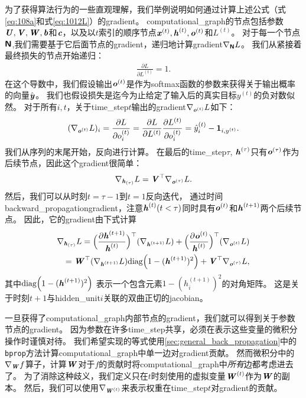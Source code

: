 为了获得算法行为的一些直观理解，我们举例说明如何通过计算上述公式（式\eqref{eq:108a}和式\eqref{eq:1012L}）的\gls{gradient}。
\gls{computational_graph}的节点包括参数$\boldsymbol{\mathit{U}},\boldsymbol{\mathit{V}},\boldsymbol{\mathit{W}}, \boldsymbol{\mathit{b}}$和$\boldsymbol{\mathit{c}}$，以及以$t$索引的顺序节点$\boldsymbol{\mathit{x}}^{(t)}, \boldsymbol{\mathit{h}}^{(t)},\boldsymbol{\mathit{o}}^{(t)}$和$L^{(t)}$。
对于每一个节点$\textsf{\textbf{N}}$,我们需要基于它后面节点的\gls{gradient}，递归地计算\gls{gradient}$\nabla_{\textsf{\textbf{N}}} L$。
我们从紧接着最终损失的节点开始递归：
\begin{align}
 \frac{\partial L}{\partial L^{(t)}} = 1.
\end{align}
在这个导数中，我们假设输出$\boldsymbol{\mathit{o}}^{(t)}$是作为\gls{softmax}函数的参数来获得关于输出概率的向量$\hat{\boldsymbol{\mathit{y}}}$。
我们也假设损失是迄今为止给定了输入后的真实目标$y^{(t)}$的负对数似然。
对于所有$i,t$，关于\gls{time_step}$t$输出的\gls{gradient}$\nabla_{\boldsymbol{\mathit{o}}^{(t)}} L$如下：
\begin{align}
 (\nabla_{\boldsymbol{\mathit{o}}^{(t)}} L)_i =  \frac{\partial L}{\partial o_i^{(t)}} 
 =  \frac{\partial L}{\partial L^{(t)}}  \frac{\partial L^{(t)}}{\partial o_i^{(t)}}  
 = \hat y_i^{(t)} - \mathbf{1}_{i,y^{(t)}}.
\end{align}
我们从序列的末尾开始，反向进行计算。
在最后的\gls{time_step}$\tau$, $\boldsymbol{\mathit{h}}^{(\tau)}$只有$\boldsymbol{\mathit{o}}^{(\tau)}$作为后续节点，因此这个\gls{gradient}很简单：
\begin{align}
 \nabla_{\boldsymbol{\mathit{h}}_{(\tau)}} L = \boldsymbol{\mathit{V}}^\top \nabla_{\boldsymbol{\mathit{o}}^{(\tau)}} L.
\end{align}
然后，我们可以从时刻$t=\tau-1$到$t=1$反向迭代， 通过时间\gls{backward_propagation}\gls{gradient}，注意$\boldsymbol{\mathit{h}}^{(t)}(t < \tau)$同时具有$\boldsymbol{\mathit{o}}^{(t)}$和$\boldsymbol{\mathit{h}}^{(t+1)}$两个后续节点。
因此，它的\gls{gradient}由下式计算
\begin{align}
  \nabla_{\boldsymbol{\mathit{h}}_{(\tau)}} L = \Big( \frac{\partial \boldsymbol{\mathit{h}}^{(t+1)}}{ \boldsymbol{\mathit{h}}^{(t)}}  \Big)^\top(\nabla_{\boldsymbol{\mathit{h}}^{(t+1)}} L) 
  + \Big( \frac{\partial \boldsymbol{\mathit{o}}^{(t)}}{ \boldsymbol{\mathit{h}}^{(t)}}  \Big)^\top (\nabla_{\boldsymbol{\mathit{o}}^{(t)}} L) \\
  = \boldsymbol{\mathit{W}}^\top (\nabla_{\boldsymbol{\mathit{h}}^{(t+1)}} L) \text{diag} \Big( 1 - (\boldsymbol{\mathit{h}}^{(t+1)})^2 \Big) 
  + \boldsymbol{\mathit{V}}^\top \nabla_{\boldsymbol{\mathit{o}}^{(\tau)}} L,
\end{align}
其中$\text{diag} \Big( 1 - (\boldsymbol{\mathit{h}}^{(t+1)})^2 \Big) $ 表示一个包含元素$1 - (h_i^{(t+1)})^2$的对角矩阵。
这是关于时刻$t+1$与\gls{hidden_unit}$i$关联的双曲正切的\gls{jacobian}。


一旦获得了\gls{computational_graph}内部节点的\gls{gradient}，我们就可以得到关于参数节点的\gls{gradient}。
因为参数在许多\gls{time_step}共享，必须在表示这些变量的微积分操作时谨慎对待。
我们希望实现的等式使用\ref{sec:general_back_propagation}中的{\tt bprop}方法计算\gls{computational_graph}中单一边对\gls{gradient}贡献。
然而微积分中的$\nabla_{\boldsymbol{\mathit{W}}} f$算子，计算$\boldsymbol{\mathit{W}}$对于$f$的贡献时将\gls{computational_graph}中\emph{所有}边都考虑进去了。
为了消除这种歧义，我们定义只在$t$时刻使用的虚拟变量$\boldsymbol{\mathit{W}}^{(t)}$作为$\boldsymbol{\mathit{W}}$的副本。
然后，我们可以使用$\nabla_{\boldsymbol{\mathit{W}}^{(t)}}$来表示权重在\gls{time_step}$t$对\gls{gradient}的贡献。

